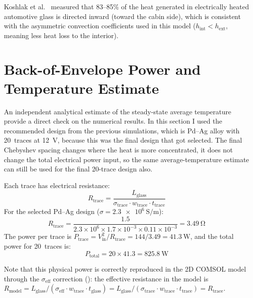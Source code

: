 Koshlak et al.\ \cite{koshlak2024} measured that 83--85\% of the heat generated in electrically heated automotive glass is directed inward (toward the cabin side), which is consistent with the asymmetric convection coefficients used in this model ($h_\text{int} < h_\text{ext}$, meaning less heat loss to the interior).

\section{Back-of-Envelope Power and Temperature Estimate}
\label{sec:back-of-envelope}

An independent analytical estimate of the steady-state average temperature provide a direct check on the numerical results. In this section I used the recommended design from the previous simulations, which is Pd--Ag alloy with 20~traces at \SI{12}{\volt}, because this was the final design that got selected. The final Chebyshev spacing changes where the heat is more concentrated, it does not change the total electrical power input, so the same average-temperature estimate can still be used for the final 20-trace design also.

Each trace has electrical resistance:
\begin{equation}
    R_\text{trace} = \frac{L_\text{glass}}{\sigma_\text{trace} \cdot w_\text{trace} \cdot t_\text{trace}}
    \label{eq:trace-resistance}
\end{equation}
For the selected Pd--Ag design ($\sigma = \SI{2.3e6}{\siemens\per\metre}$):
\begin{equation}
    R_\text{trace} = \frac{1.5}{2.3 \times 10^6 \times 1.7 \times 10^{-3} \times 0.11 \times 10^{-3}} = \SI{3.49}{\ohm}
\end{equation}
The power per trace is $P_\text{trace} = V_\text{in}^2 / R_\text{trace} = 144 / 3.49 = \SI{41.3}{\watt}$, and the total power for 20~traces is:
\begin{equation}
    P_\text{total} = 20 \times 41.3 = \SI{825.8}{\watt}
\end{equation}

Note that this physical power is correctly reproduced in the 2D COMSOL model through the $\sigma_\text{eff}$ correction (): the effective resistance in the model is $R_\text{model} = L_\text{glass}/(\sigma_\text{eff} \cdot w_\text{trace} \cdot t_\text{glass}) = L_\text{glass}/(\sigma_\text{trace} \cdot w_\text{trace} \cdot t_\text{trace}) = R_\text{trace}$.


